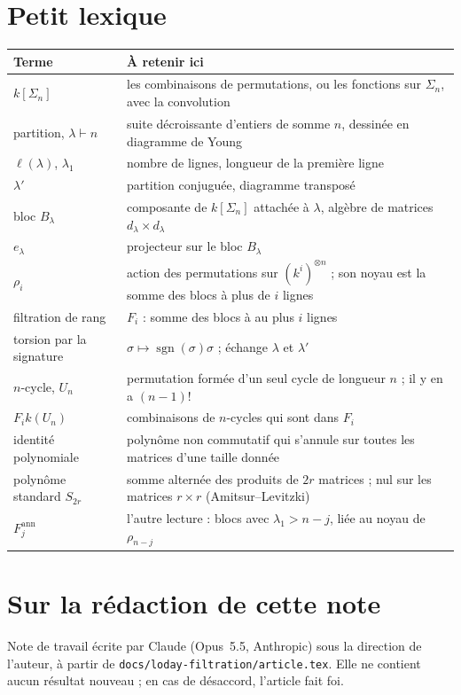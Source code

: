 \documentclass[11pt,a4paper]{amsart}
\theoremstyle{definition}
\theoremstyle{plain}
\theoremstyle{remark}
\newcommand{\sgn}{\operatorname{sgn}}
\begin{document}
\section{Petit lexique}

\begin{tabular}{@{}p{4.2cm}p{9.6cm}@{}}
\toprule
Terme & À retenir ici \\
\midrule
$k[\Sigma_n]$ & les combinaisons de permutations, ou les fonctions sur $\Sigma_n$, avec la convolution \\[2pt]
partition, $\lambda \vdash n$ & suite décroissante d'entiers de somme $n$, dessinée en diagramme de Young \\[2pt]
$\ell(\lambda)$, $\lambda_1$ & nombre de lignes, longueur de la première ligne \\
$\lambda'$ & partition conjuguée, diagramme transposé \\
bloc $B_\lambda$ & composante de $k[\Sigma_n]$ attachée à $\lambda$, algèbre de matrices $d_\lambda \times d_\lambda$ \\[2pt]
$e_\lambda$ & projecteur sur le bloc $B_\lambda$ \\
$\rho_i$ & action des permutations sur $(k^i)^{\otimes n}$ ; son noyau est la somme des blocs à plus de $i$ lignes \\[2pt]
filtration de rang & $F_i$ : somme des blocs à au plus $i$ lignes \\
torsion par la signature & $\sigma \mapsto \sgn(\sigma)\sigma$ ; échange $\lambda$ et $\lambda'$ \\
$n$-cycle, $U_n$ & permutation formée d'un seul cycle de longueur $n$ ; il y en a $(n-1)!$ \\[2pt]
$F_i k(U_n)$ & combinaisons de $n$-cycles qui sont dans $F_i$ \\
identité polynomiale & polynôme non commutatif qui s'annule sur toutes les matrices d'une taille donnée \\[2pt]
polynôme standard $S_{2r}$ & somme alternée des produits de $2r$ matrices ; nul sur les matrices $r \times r$ (Amitsur--Levitzki) \\[2pt]
$F^{\mathrm{ann}}_j$ & l'autre lecture : blocs avec $\lambda_1 > n - j$, liée au noyau de $\rho_{n-j}$ \\
\bottomrule
\end{tabular}

\section*{Sur la rédaction de cette note}

Note de travail écrite par Claude (Opus~5.5, Anthropic) sous la direction de l'auteur, à partir de \texttt{docs/loday-filtration/article.tex}. Elle ne contient aucun résultat nouveau ; en cas de désaccord, l'article fait foi.
\end{document}
